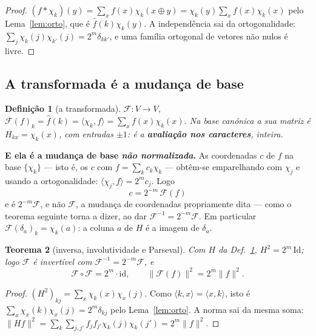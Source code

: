 \documentclass[11pt,a4paper]{article}
\newtheorem{teorema}{Teorema}
\newtheorem{definicao}[teorema]{Definição}
\begin{document}
\begin{proof}
$(f*\chi_k)(y)=\sum_x f(x)\chi_k(x\oplus y)=\chi_k(y)\sum_x f(x)\chi_k(x)$ pelo
Lema~\ref{lem:orto}, que é $\widehat{f}(k)\chi_k(y)$. A independência sai da
ortogonalidade: $\sum_j\chi_k(j)\chi_{k'}(j)=2^{m}\delta_{kk'}$, e uma família
ortogonal de vetores não nulos é livre.
\end{proof}

\subsection*{A transformada é a mudança de base}

\begin{definicao}[a transformada]\label{def:transf}
$\mathcal{F}\colon V\to V$, $\mathcal{F}(f)_k=\widehat{f}(k)=\langle\chi_k,f\rangle=\sum_x f(x)\chi_k(x)$.
Na base canónica a sua matriz é $H_{kx}=\chi_k(x)$, com entradas $\pm1$: é a
\textbf{avaliação nos caracteres}, inteira.
\end{definicao}

\medskip\noindent\textbf{E ela é a mudança de base \emph{não normalizada}.} As
coordenadas $c$ de $f$ na base $\{\chi_k\}$ --- isto é, os $c$ com
$f=\sum_k c_k\chi_k$ --- obtêm-se emparelhando com $\chi_j$ e usando a
ortogonalidade: $\langle\chi_j,f\rangle=2^{m}c_j$. Logo
\[
\boxed{\;c=2^{-m}\,\mathcal{F}(f)\;}
\]
e é $2^{-m}\mathcal{F}$, e não $\mathcal{F}$, a mudança de coordenadas propriamente dita --- como o
teorema seguinte torna a dizer, ao dar $\mathcal{F}^{-1}=2^{-m}\mathcal{F}$. Em particular
$\mathcal{F}(\delta_a)_k=\chi_k(a)$: a coluna $a$ de $H$ é a imagem de $\delta_a$.

\begin{teorema}[inversa, involutividade e Parseval]\label{thm:H}
Com $H$ da Def.~\ref{def:transf}, $H^{2}=2^{m}\,\mathrm{Id}$; logo $\mathcal{F}$ é invertível com $\mathcal{F}^{-1}=2^{-m}\mathcal{F}$, e
\[
\mathcal{F}\circ \mathcal{F}=2^{m}\cdot\mathrm{id},\qquad
\lVert \mathcal{F}(f)\rVert^{2}=2^{m}\lVert f\rVert^{2}.
\]
\end{teorema}

\begin{proof}
$(H^2)_{k j}=\sum_x\chi_k(x)\chi_x(j)$. Como $\langle k,x\rangle=\langle x,k\rangle$,
isto é $\sum_x\chi_x(k)\chi_x(j)=2^{m}\delta_{kj}$ pelo Lema~\ref{lem:orto}. A norma
sai da mesma soma: $\lVert Hf\rVert^2=\sum_k\sum_{j,j'}f_jf_{j'}\chi_k(j)\chi_k(j')
=2^{m}\lVert f\rVert^2$.
\end{proof}
\end{document}
